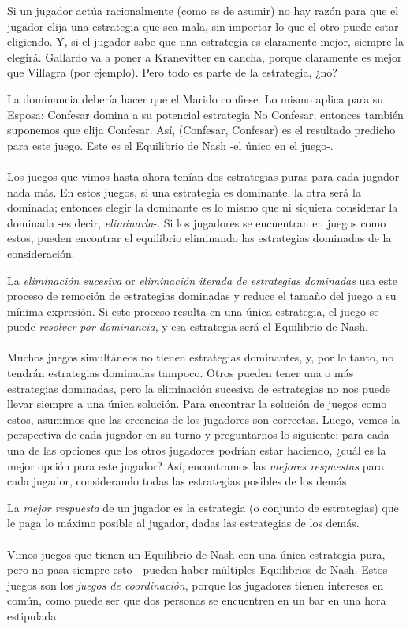 \documentclass{article}
\begin{document}
        Si un jugador actúa racionalmente (como es de asumir) no hay razón para que el jugador elija una estrategia que sea mala, sin importar lo que el otro puede estar eligiendo. Y, si el jugador sabe que una estrategia es claramente mejor, siempre la elegirá. Gallardo va a poner a Kranevitter en cancha, porque claramente es mejor que Villagra (por ejemplo). Pero todo es parte de la estrategia, ¿no?

        La dominancia debería hacer que el Marido confiese. Lo mismo aplica para su Esposa: Confesar domina a su potencial estrategia No Confesar; entonces también suponemos que elija Confesar. Así, (Confesar, Confesar) es el resultado predicho para este juego. Este es el Equilibrio de Nash -el único en el juego-.
        \\
        \\
        Los juegos que vimos hasta ahora tenían dos estrategias puras para cada jugador nada más. En estos juegos, si una estrategia es dominante, la otra será la dominada; entonces elegir la dominante es lo mismo que ni siquiera considerar la dominada -es decir, \emph{eliminarla}-. Si los jugadores se encuentran en juegos como estos, pueden encontrar el equilibrio eliminando las estrategias dominadas de la consideración.
        
        La \emph{eliminación sucesiva} or \emph{eliminación iterada de estrategias dominadas} usa este proceso de remoción de estrategias dominadas y reduce el tamaño del juego a su mínima expresión. Si este proceso resulta en una única estrategia, el juego se puede \emph{resolver por dominancia}, y esa estrategia será el Equilibrio de Nash.
        \\
        \\
        Muchos juegos simultáneos no tienen estrategias dominantes, y, por lo tanto, no tendrán estrategias dominadas tampoco. Otros pueden tener una o más estrategias dominadas, pero la eliminación sucesiva de estrategias no nos puede llevar siempre a una única solución. Para encontrar la solución de juegos como estos, asumimos que las creencias de los jugadores son correctas. Luego, vemos la perspectiva de cada jugador en su turno y preguntarnos lo siguiente: para cada una de las opciones que los otros jugadores podrían estar haciendo, ¿cuál es la mejor opción para este jugador? Así, encontramos las \emph{mejores respuestas} para cada jugador, considerando todas las estrategias posibles de los demás.

        La \emph{mejor respuesta} de un jugador es la estrategia (o conjunto de estrategias) que le paga lo máximo posible al jugador, dadas las estrategias de los demás.
        \\
        \\
        Vimos juegos que tienen un Equilibrio de Nash con una única estrategia pura, pero no pasa siempre esto - pueden haber múltiples Equilibrios de Nash. Estos juegos son los \emph{juegos de coordinación}, porque los jugadores tienen intereses en común, como puede ser que dos personas se encuentren en un bar en una hora estipulada.
\end{document}
